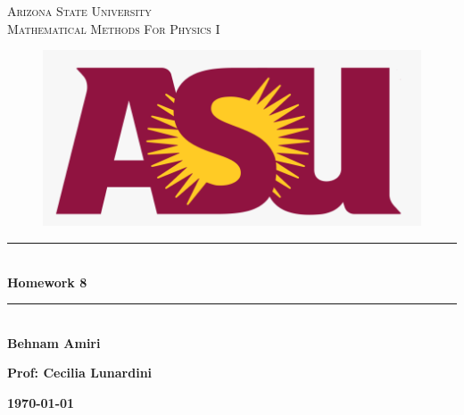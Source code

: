 \documentclass[fleqn]{article}
\begin{document}
  \begin{titlepage}

    \newcommand{\HRule}{\rule{\linewidth}{0.5mm}} %

    \center %
    


    \textsc{\LARGE Arizona State University}\\[1.5cm]

    \textsc{\LARGE Mathematical Methods For Physics I }\\[1.5cm]


    \begin{figure}
      \includegraphics[width=\linewidth]{asu.png}
    \end{figure}


    \HRule \\[0.4cm]
    { \huge \bfseries Homework 8}\\[0.4cm] 
    \HRule \\[1.5cm]
    
    \textbf{Behnam Amiri}

    \bigbreak

    \textbf{Prof: Cecilia Lunardini}

    \bigbreak


    \textbf{{\large \today}\\[2cm]}

    \vfill %

  \end{titlepage}
\end{document}
